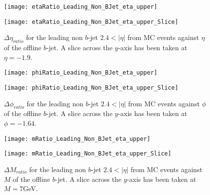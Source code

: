 		\begin{figure}[h]
			\centering

			\begin{minipage}[h]{0.33\linewidth}
				\texttt{[image: etaRatio\_Leading\_Non\_BJet\_eta\_upper]}
			\end{minipage}
			\quad
			\begin{minipage}[h]{0.33\linewidth}
				\texttt{[image: etaRatio\_Leading\_Non\_BJet\_eta\_upper\_Slice]}
			\end{minipage}
			\caption{$\Delta \eta_{ratio}$ for the leading \pt non $b$-jet $2.4 < |\eta|$ from MC events against $\eta$ of the offline $b$-jet. A slice across the $y$-axis has been taken at $\eta=-1.9$. }
			\label{fig:MC:leadingnonbetaforward}
		\end{figure}

		\begin{figure}[h]
			\centering

			\begin{minipage}[h]{0.33\linewidth}
				\texttt{[image: phiRatio\_Leading\_Non\_BJet\_eta\_upper]}
			\end{minipage}
			\quad
			\begin{minipage}[h]{0.33\linewidth}
				\texttt{[image: phiRatio\_Leading\_Non\_BJet\_eta\_upper\_Slice]}
			\end{minipage}
			\caption{$\Delta \phi_{ratio}$ for the leading \pt non $b$-jet $2.4 < |\eta|$ from MC events against $\phi$ of the offline $b$-jet. A slice across the $y$-axis has been taken at $\phi=-1.64$. }
			\label{fig:MC:leadingnonbphiforward}
		\end{figure}

		\begin{figure}[h]
			\centering

			\begin{minipage}[h]{0.33\linewidth}
				\texttt{[image: mRatio\_Leading\_Non\_BJet\_eta\_upper]}
			\end{minipage}
			\quad
			\begin{minipage}[h]{0.33\linewidth}
				\texttt{[image: mRatio\_Leading\_Non\_BJet\_eta\_upper\_Slice]}
			\end{minipage}
			\caption{$\Delta M_{ratio}$ for the leading \pt non $b$-jet $2.4 < |\eta|$ from MC events against $M$ of the offline $b$-jet. A slice across the $y$-axis has been taken at $M=7$GeV. }
			\label{fig:MC:leadingnonbmforward}
		\end{figure}

